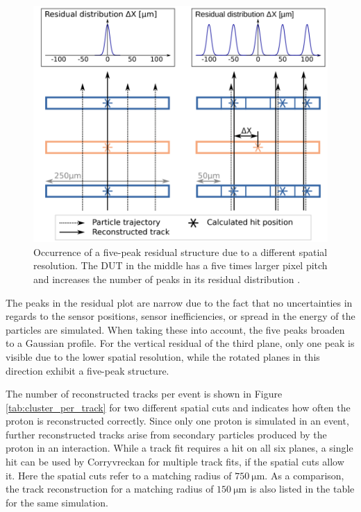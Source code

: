 \begin{figure}
  \centering
  \includegraphics[height=0.6\textwidth]{images/peaks.png}
  \caption{Occurrence of a five-peak residual structure due to a different spatial resolution. The DUT in the middle
  has a five times larger pixel pitch and increases the number of peaks in its residual distribution \cite{peaks}.}
  \label{fig:peaks}
\end{figure}

The peaks in the residual plot are narrow due to the fact that no uncertainties in regards
to the sensor positions, sensor inefficiencies, or spread in the energy of the particles are simulated. When taking these into account, the
five peaks broaden to a Gaussian profile.
For the vertical residual of the third plane, only one peak is visible due to the lower spatial resolution, while the rotated planes
in this direction exhibit a five-peak structure.

The number of reconstructed tracks per event is shown in Figure \ref{tab:cluster_per_track} for two different spatial cuts and indicates how often the proton is
reconstructed correctly. Since only one proton is simulated in an event, further reconstructed tracks arise from secondary
particles produced by the proton in an interaction. While a track fit requires a hit on all six planes, a single hit can be used by
Corryvreckan for multiple track fits, if the spatial cuts allow it. Here the spatial cuts refer to a matching radius of $\SI{750}{\micro\meter}$.
As a comparison, the track reconstruction for a matching radius of $\SI{150}{\micro\meter}$ is also listed in the table for the same
simulation.

